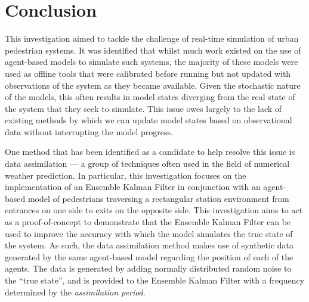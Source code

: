 \chapter{Conclusion}\label{ch:conclusion}


This investigation aimed to tackle the challenge of real-time simulation of
urban pedestrian systems.
It was identified that whilst much work existed on the use of agent-based models
to simulate such systems, the majority of these models were used as offline
tools that were calibrated before running but not updated with observations of
the system as they became available.
Given the stochastic nature of the models, this often results in model
states diverging from the real state of the system that they seek to simulate.
This issue owes largely to the lack of existing methods by which we can update
model states based on observational data without interrupting the model
progress.

One method that has been identified as a candidate to help resolve this issue is
data assimilation --- a group of techniques often used in the field of numerical
weather prediction.
In particular, this investigation focuses on the implementation of an Ensemble
Kalman Filter in conjunction with an agent-based model of pedestrians traversing
a rectangular station environment from entrances on one side to exits on the
opposite side.
This investigation aims to act as a proof-of-concept to demonstrate that the
Ensemble Kalman Filter can be used to improve the accuracy with which the model
simulates the true state of the system.
As such, the data assimilation method makes use of synthetic data generated by
the same agent-based model regarding the position of each of the agents.
The data is generated by adding normally distributed random noise to the ``true
state'', and is provided to the Ensemble Kalman Filter with a frequency
determined by the \emph{assimilation period}.

